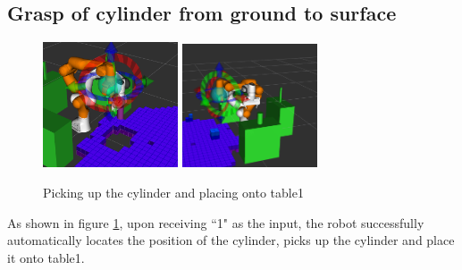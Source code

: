 \subsection{Grasp of cylinder from ground to surface}
\begin{figure}[h]
    \centering
    \includegraphics[width=4cm]{figures/grasp1.png}
    \includegraphics[width=4cm]{figures/grasp2.png}
    \caption{Picking up the cylinder and placing onto table1}
    \label{fig:grasp}
\end{figure}
As shown in figure \ref{fig:grasp}, upon receiving ``1" as the input, the robot successfully automatically locates the position of the cylinder, picks up the cylinder and place it onto table1.

